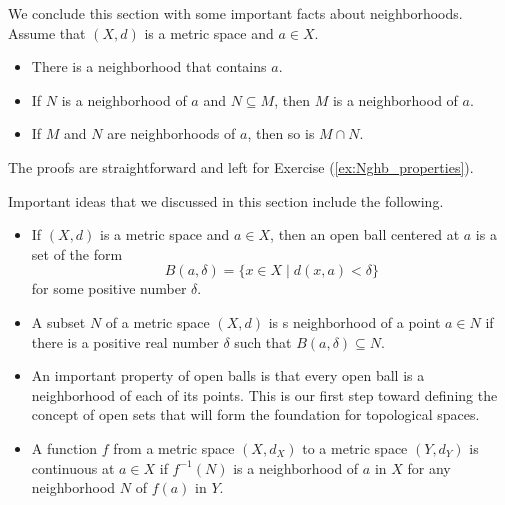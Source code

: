 \begin{comment}

\ActivitySolution
\ba
\item We need to show that the inverse image of any open ball centered at $f(a)$ contains an open ball centered at $a$.

\item We showed earlier that an open ball is a neighborhood of each of its points.

\item Our hypothesis tells us that $f^{-1}\left(B(f(a), \epsilon)\right)$ is a neighborhood of $a$ in $X$. 

\item As a neighborhood of $a$, it follows that there exists $\delta > 0$ such that $B(a, \delta) \subseteq f^{-1}\left(B(f(a), \epsilon)\right)$. 

\item The previous parts show that given any $\epsilon > 0$ there exists $\delta > 0$ such that $B(a, \delta) \subseteq f^{-1}\left(B(f(a), \epsilon)\right)$. Theorem \ref{thm:open_ball_continuity} then shows that $f$ is continuous at $a$. 

\ea

\end{comment}

\noindent We conclude this section with some important facts about neighborhoods. Assume that $(X,d)$ is a metric space and $a \in X$. 

\begin{itemize}
\item There is a neighborhood that contains $a$.
\item If $N$ is a neighborhood of $a$ and $N \subseteq M$, then $M$ is a neighborhood of $a$.
\item If $M$ and $N$ are neighborhoods of $a$, then so is $M \cap N$.
\end{itemize}

The proofs are straightforward and left for Exercise (\ref{ex:Nghb_properties}).

Important ideas that we discussed in this section include the following.
\begin{itemize}
\item If $(X,d)$ is a metric space and $a \in X$, then an open ball centered at $a$ is a set of the form
\[B(a,\delta) = \{ x \in X \mid d(x,a) < \delta\}\]
for some positive number $\delta$. 
\item A subset $N$ of a metric space $(X,d)$ is s neighborhood of a point $a \in N$ if there is a positive real number $\delta$ such that $B(a,\delta) \subseteq N$.
\item An important property of open balls is that every open ball is a neighborhood of each of its points. This is our first step toward defining the concept of open sets that will form the foundation for topological spaces. 
\item A function $f$ from a metric space $(X,d_X)$ to a metric space $(Y,d_Y)$ is continuous at $a \in X$ if $f^{-1}(N)$ is a neighborhood of $a$ in $X$ for any neighborhood $N$ of $f(a)$ in $Y$. 
\end{itemize}


